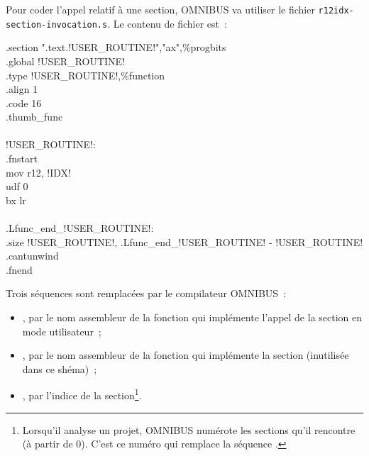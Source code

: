 Pour coder l'appel relatif à une section, OMNIBUS va utiliser le fichier \texttt{r12idx-section-invocation.s}. Le contenu de fichier est~:
\begin{SHELL}\small
\hspace*{1.2em}.section  ".text.!USER\_ROUTINE!","ax",\%progbits\\
\hspace*{1.2em}.global !USER\_ROUTINE!\\
\hspace*{1.2em}.type  !USER\_ROUTINE!,\%function\\
\hspace*{1.2em}.align  1\\
\hspace*{1.2em}.code  16\\
\hspace*{1.2em}.thumb\_func\\
\\
!USER\_ROUTINE!:\\
\hspace*{1.2em}.fnstart\\
\hspace*{1.2em}mov r12, !IDX!\\
\hspace*{1.2em}udf 0\\
\hspace*{1.2em}bx  lr\\
\\
.Lfunc\_end\_!USER\_ROUTINE!:\\
\hspace*{1.2em}.size  !USER\_ROUTINE!, .Lfunc\_end\_!USER\_ROUTINE! - !USER\_ROUTINE!\\
\hspace*{1.2em}.cantunwind\\
\hspace*{1.2em}.fnend
\end{SHELL}

Trois séquences sont remplacées par le compilateur OMNIBUS~:
\begin{itemize}
\item {}, par le nom assembleur de la fonction qui implémente l'appel de la section en mode utilisateur~;
\item {}, par le nom assembleur de la fonction qui implémente la section (inutilisée dans ce shéma)~;
\item {}, par l'indice de la section\footnote{Lorsqu'il analyse un projet, OMNIBUS numérote les sections qu'il rencontre (à partir de $0$). C'est ce numéro qui remplace la séquence .}.
\end{itemize}

